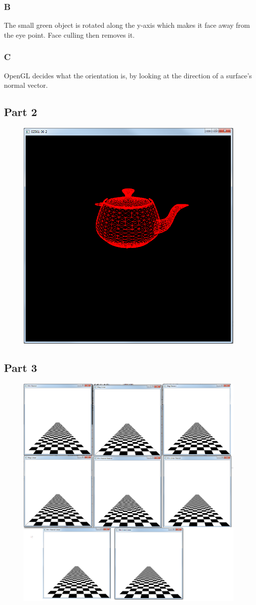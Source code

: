 \documentclass[11pt]{article}
\begin{document}
\subsubsection{B}
The small green object is rotated along the y-axis which makes it face away from the eye point. Face culling then removes it.

\subsubsection{C}
OpenGL decides what the orientation is, by looking at the direction of a surface's normal vector.


\subsection{Part 2}
\begin{figure}[H]
	\centering
	\includegraphics[width=0.5\linewidth]{images/e06p2}
	\label{fig:e06p2}
\end{figure}


\subsection{Part 3}
\begin{figure}[H]
	\centering
	\includegraphics[width=0.5\linewidth]{images/e06p3}
	\label{fig:e06p3}
\end{figure}
\end{document}
